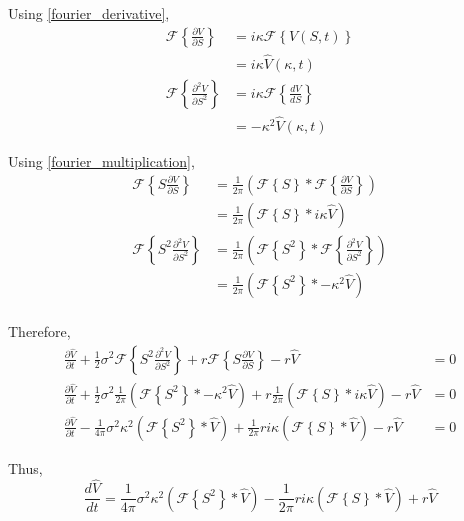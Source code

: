 \noindent
Using \cref{fourier_derivative},
\begin{align}
    \mathcal{F} \left\{ \frac{\partial V}{\partial S} \right\} &= i \kappa \mathcal{F} \left\{ V(S, t) \right\} \\
    &= i \kappa \hat{V}(\kappa, t) \\
    \mathcal{F} \left\{ \frac{\partial^2 V}{\partial S^2} \right\} & = i \kappa \mathcal{F} \left\{ \frac{dV}{dS} \right\} \\
    & = -\kappa^2 \hat{V}(\kappa, t)
\end{align}

\noindent
Using \cref{fourier_multiplication},
\begin{align}
    \mathcal{F} \left\{ S\frac{\partial V}{\partial S} \right\} &= \frac{1}{2 \pi}( \mathcal{F} \left\{ S \right\} * \mathcal{F} \left\{ \frac{\partial V}{\partial S} \right\} ) \\
    &= \frac{1}{2 \pi}( \mathcal{F} \left\{ S \right\} * i \kappa \hat{V} ) \\
    \mathcal{F} \left\{ S^2 \frac{\partial^2 V}{\partial S^2} \right\} &= \frac{1}{2 \pi}( \mathcal{F} \left\{ S^2 \right\} * \mathcal{F} \left\{ \frac{\partial^2 V}{\partial S^2} \right\} ) \\
    &= \frac{1}{2 \pi}( \mathcal{F} \left\{ S^2 \right\} * -\kappa^2 \hat{V} ) \\
\end{align}

\noindent
Therefore,
\begin{align}
    \frac{\partial \hat{V}}{\partial t} + \frac{1}{2}\sigma^2 \mathcal{F} \left\{ S^2 \frac{\partial^2 V}{\partial S^2} \right\} + r \mathcal{F} \left\{ S\frac{\partial V}{\partial S} \right\} - r \hat{V} &= 0 \\
    \frac{\partial \hat{V}}{\partial t} + \frac{1}{2}\sigma^2 \frac{1}{2 \pi}( \mathcal{F} \left\{ S^2 \right\} * -\kappa^2 \hat{V} ) + r \frac{1}{2 \pi}( \mathcal{F} \left\{ S \right\} * i \kappa \hat{V} ) - r \hat{V} &= 0 \\
    \frac{\partial \hat{V}}{\partial t} - \frac{1}{4 \pi}\sigma^2 \kappa^2 ( \mathcal{F} \left\{ S^2 \right\} * \hat{V} ) + \frac{1}{2 \pi} r i \kappa ( \mathcal{F} \left\{ S \right\} * \hat{V} ) - r \hat{V} &= 0
\end{align}

\noindent
Thus,
\begin{equation}
    \frac{d \hat{V}}{dt} = \frac{1}{4 \pi}\sigma^2 \kappa^2 ( \mathcal{F} \left\{ S^2 \right\} * \hat{V} ) - \frac{1}{2 \pi} r i \kappa ( \mathcal{F} \left\{ S \right\} * \hat{V} ) + r \hat{V}
\end{equation}
